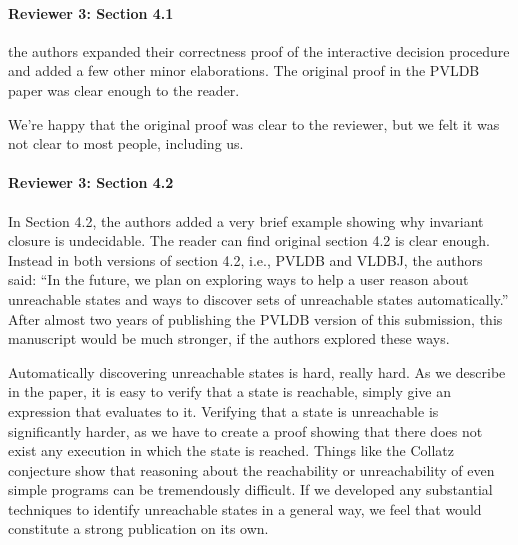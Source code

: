 \documentclass[9pt]{article}
\begin{document}
\begin{multicols*}{2}
\paragraph{Reviewer 3: Section 4.1}
\begin{feedback}
  the authors expanded their correctness proof of the interactive decision
  procedure and added a few other minor elaborations. The original proof in the
  PVLDB paper was clear enough to the reader.
\end{feedback}
We're happy that the original proof was clear to the reviewer, but we felt it
was not clear to most people, including us.

\paragraph{Reviewer 3: Section 4.2}
\begin{feedback}
  In Section 4.2, the authors added a very brief example showing why invariant
  closure is undecidable. The reader can find original section 4.2 is clear
  enough. Instead in both versions of section 4.2, i.e., PVLDB and VLDBJ, the
  authors said: ``In the future, we plan on exploring ways to help a user
  reason about unreachable states and ways to discover sets of unreachable
  states automatically.'' After almost two years of publishing the PVLDB
  version of this submission, this manuscript would be much stronger, if the
  authors explored these ways.
\end{feedback}
Automatically discovering unreachable states is hard, really hard. As we
describe in the paper, it is easy to verify that a state is reachable, simply
give an expression that evaluates to it. Verifying that a state is unreachable
is significantly harder, as we have to create a proof showing that there does
not exist any execution in which the state is reached. Things like the Collatz
conjecture show that reasoning about the reachability or unreachability of even
simple programs can be tremendously difficult. If we developed any substantial
techniques to identify unreachable states in a general way, we feel that would
constitute a strong publication on its own.


\end{multicols*}
\end{document}
